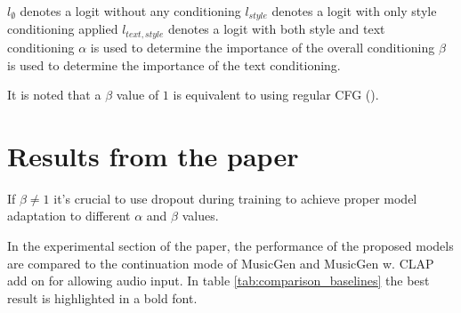 \documentclass[a4paper,12pt,twoside]{article}
\begin{document}
\begin{outline}
    \1 $l_{\emptyset}$ denotes a logit without any conditioning
    \1 $l_{style}$ denotes a logit with only style conditioning applied
    \1 $l_{text,style}$ denotes a logit with both style and text conditioning
    \1 $\alpha$ is used to determine the importance of the overall conditioning
    \1 $\beta$ is used to determine the importance of the text conditioning.
\end{outline}

It is noted that a $\beta$ value of $1$ is equivalent to using regular CFG (\cite{rouardAudioConditioningMusic2024}).
\section{Results from the paper}\label{sec:paperResults} If $\beta \neq 1$ it's crucial to use dropout during training to achieve proper model adaptation to different $\alpha$ and $\beta$ values.

In the experimental section of the paper, the performance of the proposed models are compared to the continuation mode of MusicGen and MusicGen w. CLAP add on for allowing audio input. In table \ref{tab:comparison_baselines} the best result is highlighted in a bold font.
\end{document}
